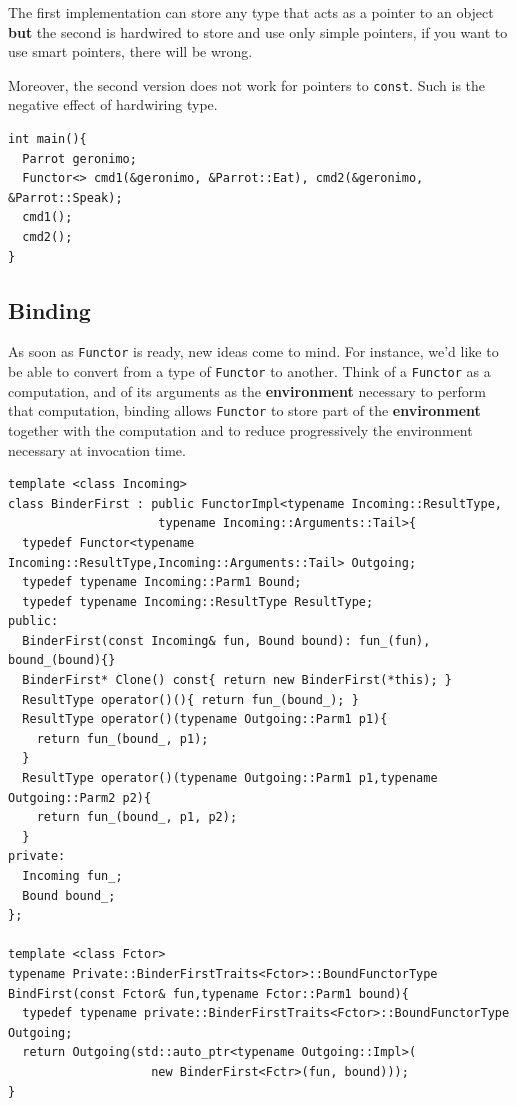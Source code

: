 The first implementation can store any type that acts as a pointer to an
object \textbf{but} the second is hardwired to store and use only
simple pointers, if you want to use smart pointers, there will be
wrong.

Moreover, the second version does not work for pointers to
\texttt{const}. Such is the negative effect of hardwiring type.

\begin{verbatim}
int main(){
  Parrot geronimo;
  Functor<> cmd1(&geronimo, &Parrot::Eat), cmd2(&geronimo, &Parrot::Speak);
  cmd1();
  cmd2();
}
\end{verbatim}

\subsection{Binding}

As soon as \texttt{Functor} is ready, new ideas come to mind. For
instance, we'd like to be able to convert from a type of
\texttt{Functor} to another. Think of a \texttt{Functor} as a
computation, and of its arguments as the \textbf{environment}
necessary to perform that computation,  binding allows
\texttt{Functor} to store part of the \textbf{environment} together
with the computation and to reduce progressively the environment
necessary at invocation time.

\begin{verbatim}
template <class Incoming>
class BinderFirst : public FunctorImpl<typename Incoming::ResultType, 
                     typename Incoming::Arguments::Tail>{
  typedef Functor<typename Incoming::ResultType,Incoming::Arguments::Tail> Outgoing;
  typedef typename Incoming::Parm1 Bound;
  typedef typename Incoming::ResultType ResultType;
public:
  BinderFirst(const Incoming& fun, Bound bound): fun_(fun), bound_(bound){}
  BinderFirst* Clone() const{ return new BinderFirst(*this); }
  ResultType operator()(){ return fun_(bound_); }
  ResultType operator()(typename Outgoing::Parm1 p1){
    return fun_(bound_, p1);
  }
  ResultType operator()(typename Outgoing::Parm1 p1,typename Outgoing::Parm2 p2){
    return fun_(bound_, p1, p2);
  }
private:
  Incoming fun_;
  Bound bound_;
};

template <class Fctor>
typename Private::BinderFirstTraits<Fctor>::BoundFunctorType
BindFirst(const Fctor& fun,typename Fctor::Parm1 bound){
  typedef typename private::BinderFirstTraits<Fctor>::BoundFunctorType Outgoing;
  return Outgoing(std::auto_ptr<typename Outgoing::Impl>(
                    new BinderFirst<Fctr>(fun, bound)));
}
\end{verbatim}


